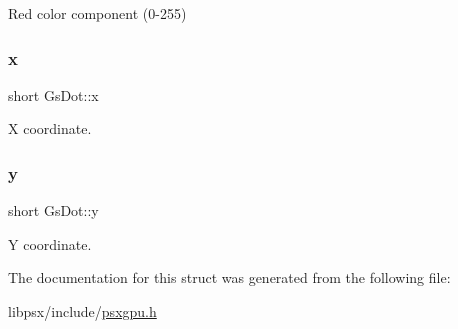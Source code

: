 Red color component (0-\/255) 

\mbox{\label{structGsDot_a3cbac231ecaa41fb57f867895fca1891}} 
\subsubsection{\texorpdfstring{x}{x}}
{\footnotesize\ttfamily short Gs\+Dot\+::x}



X coordinate. 

\mbox{\label{structGsDot_af152c90f2f5a80201f7736d4ed84d61b}} 
\subsubsection{\texorpdfstring{y}{y}}
{\footnotesize\ttfamily short Gs\+Dot\+::y}



Y coordinate. 



The documentation for this struct was generated from the following file\+:\begin{DoxyCompactItemize}
\item 
libpsx/include/\hyperlink{psxgpu_8h}{psxgpu.\+h}\end{DoxyCompactItemize}
